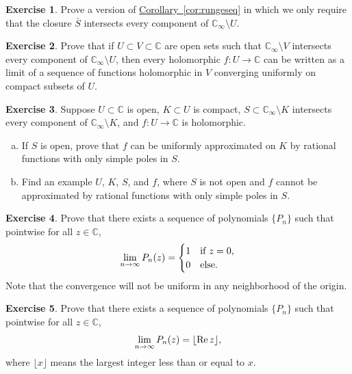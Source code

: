 \documentclass[12pt,openany]{book}
\newcommand{\avoidbreak}{\postdisplaypenalty=100}
\renewcommand{\Re}{\operatorname{Re}}
\newcommand{\C}{{\mathbb{C}}}
\theoremstyle{plain}
\theoremstyle{remark}
\theoremstyle{definition}
\newenvironment{exbox}{%
    \def\FrameCommand{\vrule width 1pt \relax\hspace{10pt}}%
    \MakeFramed{\advance\hsize-\width\FrameRestore}%
}{%
    \endMakeFramed
}
\newenvironment{exparts}{%
    \leavevmode\begin{enumerate}[a),noitemsep,topsep=0pt,parsep=0pt,partopsep=0pt]
}{%
    \end{enumerate}
}
\theoremstyle{exercise}
\newtheorem{exercise}{Exercise}[section]
\theoremstyle{example}
\newcommand{\corref}[1]{\hyperref[#1]{Corollary~\ref*{#1}}}
\begin{document}
\begin{exbox}
\begin{exercise}
Prove a version of \corref{cor:rungeseq} in which we only require that the
closure $\bar{S}$ intersects every component of $\C_\infty \setminus U$.
\end{exercise}

\begin{exercise}
Prove that if $U \subset V \subset \C$ are open sets such that
$\C_\infty \setminus V$ intersects every component of
$\C_\infty \setminus U$, then every holomorphic $f \colon U \to \C$
can be written as a limit of a sequence of functions holomorphic in $V$
converging uniformly on compact subsets of $U$.
\end{exercise}

\begin{exercise}
Suppose $U \subset \C$ is open, $K \subset U$ is compact, $S \subset
\C_\infty \setminus K$ intersects every component of $\C_\infty \setminus K$,
and $f \colon U \to \C$ is holomorphic.
\begin{exparts}
\item
If $S$ is open,
prove that $f$ can be uniformly approximated on $K$ by rational functions
with only simple poles in $S$.
\item
Find an example $U$, $K$, $S$, and $f$, where $S$ is not open and
$f$ cannot be approximated by rational functions with only simple poles
in $S$.
\end{exparts}
\end{exercise}

\begin{exercise}
Prove that there exists a sequence of polynomials $\{ P_n \}$ such that
pointwise
for all $z \in \C$,
\begin{equation*}
\lim_{n \to \infty}
P_n(z) =
\begin{cases}
1 & \text{if } z = 0, \\
0 & \text{else.}
\end{cases}
\avoidbreak
\end{equation*}
Note that the convergence will not be uniform in any neighborhood of the
origin.
\end{exercise}

\begin{exercise}
Prove that there exists a sequence of polynomials $\{ P_n \}$ such that
pointwise
for all $z \in \C$,
\begin{equation*}
\lim_{n \to \infty}
P_n(z) = \lfloor \Re z \rfloor ,
\avoidbreak
\end{equation*}
where $\lfloor x \rfloor$ means the largest integer less than or equal to
$x$. 
\end{exercise}


\end{exbox}
\end{document}
